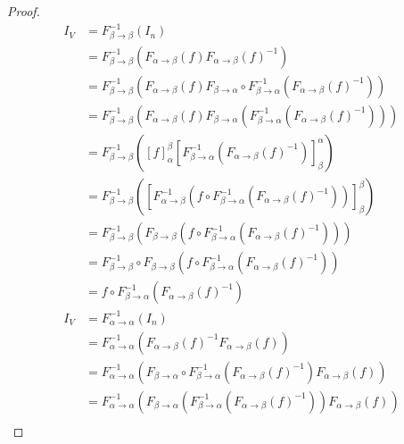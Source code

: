 \documentclass[dvipdfmx]{jsarticle}
\begin{document}
\begin{proof}
\begin{align*}
I_{V} &= F_{\beta \rightarrow \beta}^{- 1}\left( I_{n} \right)\\
&= F_{\beta \rightarrow \beta}^{- 1}\left( F_{\alpha \rightarrow \beta}(f){F_{\alpha \rightarrow \beta}(f)}^{- 1} \right)\\
&= F_{\beta \rightarrow \beta}^{- 1}\left( F_{\alpha \rightarrow \beta}(f)F_{\beta \rightarrow \alpha} \circ F_{\beta \rightarrow \alpha}^{- 1}\left( {F_{\alpha \rightarrow \beta}(f)}^{- 1} \right) \right)\\
&= F_{\beta \rightarrow \beta}^{- 1}\left( F_{\alpha \rightarrow \beta}(f)F_{\beta \rightarrow \alpha}\left( F_{\beta \rightarrow \alpha}^{- 1}\left( {F_{\alpha \rightarrow \beta}(f)}^{- 1} \right) \right) \right)\\
&= F_{\beta \rightarrow \beta}^{- 1}\left( [ f]^{\beta}_{\alpha}\left[ F_{\beta \rightarrow \alpha}^{- 1}\left( {F_{\alpha \rightarrow \beta}(f)}^{- 1} \right) \right]^{\alpha}_{\beta} \right)\\
&= F_{\beta \rightarrow \beta}^{- 1}\left( \left[ F_{\alpha \rightarrow \beta}^{- 1}\left( f \circ F_{\beta \rightarrow \alpha}^{- 1}\left( {F_{\alpha \rightarrow \beta}(f)}^{- 1} \right) \right) \right]_{\beta}^{\beta} \right)\\
&= F_{\beta \rightarrow \beta}^{- 1}\left( F_{\beta \rightarrow \beta}\left( f \circ F_{\beta \rightarrow \alpha}^{- 1}\left( {F_{\alpha \rightarrow \beta}(f)}^{- 1} \right) \right) \right)\\
&= F_{\beta \rightarrow \beta}^{- 1} \circ F_{\beta \rightarrow \beta}\left( f \circ F_{\beta \rightarrow \alpha}^{- 1}\left( {F_{\alpha \rightarrow \beta}(f)}^{- 1} \right) \right)\\
&= f \circ F_{\beta \rightarrow \alpha}^{- 1}\left( {F_{\alpha \rightarrow \beta}(f)}^{- 1} \right)\\
I_{V} &= F_{\alpha \rightarrow \alpha}^{- 1}\left( I_{n} \right)\\
&= F_{\alpha \rightarrow \alpha}^{- 1}\left( {F_{\alpha \rightarrow \beta}(f)}^{- 1}F_{\alpha \rightarrow \beta}(f) \right)\\
&= F_{\alpha \rightarrow \alpha}^{- 1}\left( F_{\beta \rightarrow \alpha} \circ F_{\beta \rightarrow \alpha}^{- 1}\left( {F_{\alpha \rightarrow \beta}(f)}^{- 1} \right)F_{\alpha \rightarrow \beta}(f) \right)\\
&= F_{\alpha \rightarrow \alpha}^{- 1}\left( F_{\beta \rightarrow \alpha}\left( F_{\beta \rightarrow \alpha}^{- 1}\left( {F_{\alpha \rightarrow \beta}(f)}^{- 1} \right) \right)F_{\alpha \rightarrow \beta}(f) \right)\\

\end{align*}
\end{proof}
\end{document}
